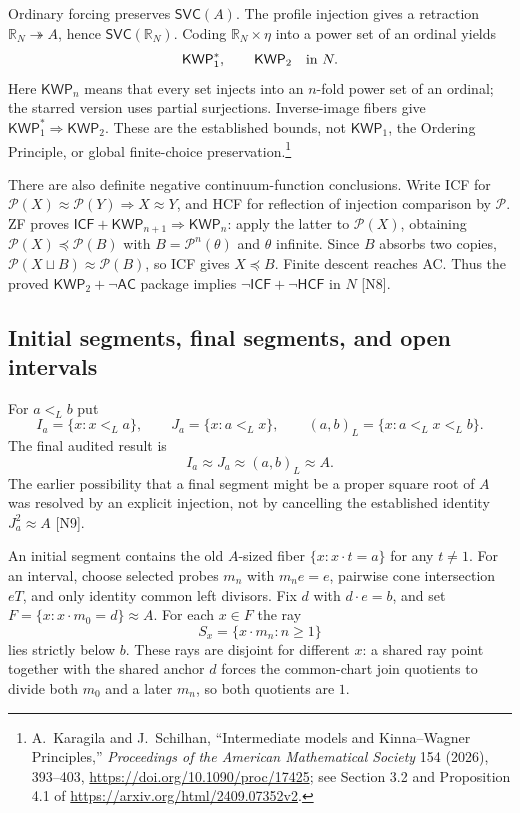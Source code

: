 Ordinary forcing preserves $\mathsf{SVC}(A)$.  The profile injection
gives a retraction $\mathbb R_N\twoheadrightarrow A$, hence
$\mathsf{SVC}(\mathbb R_N)$.  Coding
$\mathbb R_N\times\eta$ into a power set of an ordinal yields
\[
             \mathsf{KWP}^{*}_1,\qquad \mathsf{KWP}_2
             \quad\hbox{in }N.
\]
Here $\mathsf{KWP}_n$ means that every set injects into an $n$-fold
power set of an ordinal; the starred version uses partial surjections.
Inverse-image fibers give $\mathsf{KWP}^{*}_1\Rightarrow
\mathsf{KWP}_2$.  These are the established bounds, not
$\mathsf{KWP}_1$, the Ordering Principle, or global finite-choice
preservation.\footnote{A.~Karagila and J.~Schilhan,
``Intermediate models and Kinna--Wagner Principles,''
\emph{Proceedings of the American Mathematical Society} 154 (2026),
393--403, \url{https://doi.org/10.1090/proc/17425}; see Section 3.2
and Proposition 4.1 of \url{https://arxiv.org/html/2409.07352v2}.}

There are also definite negative continuum-function conclusions.
Write ICF for
$\mathcal P(X)\approx\mathcal P(Y)\Rightarrow X\approx Y$,
and HCF for reflection of injection comparison by $\mathcal P$.
ZF proves $\mathsf{ICF}+\mathsf{KWP}_{n+1}\Rightarrow
\mathsf{KWP}_n$: apply the latter to $\mathcal P(X)$, obtaining
$\mathcal P(X)\preccurlyeq\mathcal P(B)$ with
$B=\mathcal P^n(\theta)$ and $\theta$ infinite.  Since $B$ absorbs
two copies,
$\mathcal P(X\sqcup B)\approx\mathcal P(B)$, so ICF gives
$X\preccurlyeq B$.  Finite descent reaches AC.  Thus the proved
$\mathsf{KWP}_2+\neg\mathsf{AC}$ package implies
$\neg\mathsf{ICF}+\neg\mathsf{HCF}$ in $N$ [N8].

\subsection{Initial segments, final segments, and open intervals}

For $a<_L b$ put
\[
 I_a=\{x:x<_L a\},\qquad J_a=\{x:a<_L x\},\qquad
 (a,b)_L=\{x:a<_L x<_L b\}.
\]
The final audited result is
\[
                  I_a\approx J_a\approx(a,b)_L\approx A.
\]
The earlier possibility that a final segment might be a proper
square root of $A$ was resolved by an explicit injection, not by
cancelling the established identity $J_a^2\approx A$ [N9].

An initial segment contains the old $A$-sized fiber
$\{x:x\cdot t=a\}$ for any $t\neq1$.  For an interval, choose selected
probes $m_n$ with $m_ne=e$, pairwise cone intersection $eT$, and only
identity common left divisors.  Fix $d$ with $d\cdot e=b$, and set
$F=\{x:x\cdot m_0=d\}\approx A$.  For each $x\in F$ the ray
\[
                    S_x=\{x\cdot m_n:n\geq1\}
\]
lies strictly below $b$.  These rays are disjoint for different $x$:
a shared ray point together with the shared anchor $d$ forces the
common-chart join quotients to divide both $m_0$ and a later $m_n$,
so both quotients are $1$.

